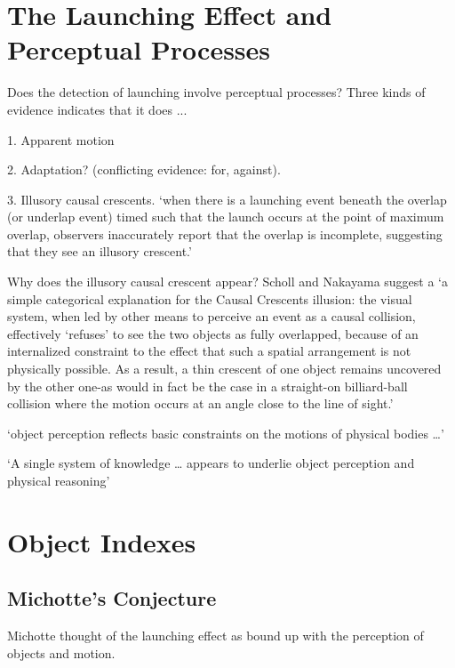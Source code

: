 \documentclass[12pt]{extarticle}
\begin{document}
\begin{multicols*}{3}
\section{The Launching Effect and Perceptual Processes}

Does the detection of launching involve perceptual processes?  Three kinds of evidence
indicates that it does ...

1. Apparent motion \citep{kim:2013_perceived}

2. Adaptation? (conflicting evidence: \citet{rolfs:2013_visual} for, \citet{arnold:2015_objectcentered} against).

3. Illusory causal crescents. ‘when there is a launching event beneath the overlap (or underlap event) timed such that
the launch occurs at the point of maximum overlap, observers inaccurately report that
the overlap is incomplete, suggesting that they see an illusory crescent.’
\citep[p.\ 461]{Scholl:2004dx}

Why does the illusory causal crescent appear?  Scholl and Nakayama suggest a
‘a simple categorical explanation for the Causal Crescents illusion: the visual system,
when led by other means to perceive an event as a causal collision, effectively
‘refuses’ to see the two objects as fully overlapped, because of an internalized
constraint to the effect that such a spatial arrangement is not physically possible.
As a result, a thin crescent of one object remains uncovered by the other one-as
would in fact be the case in a straight-on billiard-ball collision where the motion
occurs at an angle close to the line of sight.’
\citep[p.\ 466]{Scholl:2004dx}

‘object perception reflects basic constraints on the motions of physical bodies …’
\citep[p.\ 51]{Spelke:1990jn}

‘A single system of  knowledge  … appears to underlie object perception and physical reasoning’
\citep[p.\ 175]{Carey:1994bh}



\section{Object Indexes}


\subsection{Michotte’s Conjecture}
Michotte thought of the launching effect as bound up  with the perception of 
objects and motion.


\end{multicols*}
\end{document}
